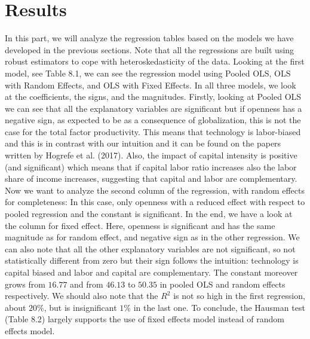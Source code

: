 \documentclass[12pt, letterpaper]{article}
\numberwithin{table}{section}   %
\begin{document}
\section{Results}\label{Results}
In this part, we will analyze the regression tables based on the models we have developed in the previous sections.
Note that all the regressions are built using robust estimators to cope with heteroskedasticity of the data.
Looking at the first model, see Table 8.1, we can see the regression model using Pooled OLS, OLS with Random Effects, and OLS with Fixed Effects. 
In all three models, we look at the coefficients, the signs, and the magnitudes. Firstly, looking at Pooled OLS we can see that all the explanatory variables are significant but if openness has a negative sign, as expected to be as a consequence of globalization, this is not the case for the total factor productivity. This means that technology is labor-biased and this is in contrast with our intuition and it can be found on the papers written by Hogrefe et al. (2017). Also, the impact of capital intensity is positive (and significant) which means that if capital labor ratio increases also the labor share of income increases, suggesting that capital and labor are complementary. Now we want to analyze the second column of the regression, with random effects for completeness: In this case, only openness with a reduced effect with respect to pooled regression and the constant is significant. In the end, we have a look at the column for fixed effect. Here, openness is significant and has the same magnitude as for random effect, and negative sign as in the other regression. We can also note that all the other explanatory variables are not significant, so not statistically different from zero but their sign follows the intuition: technology is capital biased and labor and capital are complementary. The constant moreover grows from $16.77$ and from $46.13$ to $50.35$ in pooled OLS and random effects respectively. We should also note that the $R^2$ is not so high in the first regression, about $20\%$, but is insignificant $1\%$ in the last one. 
To conclude, the Hausman test (Table 8.2) largely supports the use of fixed effects model instead of random effects model.
\end{document}
